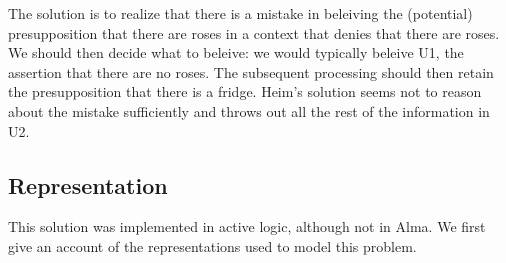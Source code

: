 \documentclass{article}
\begin{document}
The solution is to realize that there is a mistake in beleiving the
(potential) presupposition that there are roses in a context that
denies that there are roses. We should then decide what to beleive: we
would typically beleive U1, the assertion that there are no roses. The
subsequent processing should then retain the presupposition that there
is a fridge. Heim's solution seems not to reason about the mistake
sufficiently and throws out all the rest of the information in U2.



\subsection{Representation}

This solution was implemented in active logic, although not in
Alma. We first give an account of the representations used to model
this problem.

\end{document}
